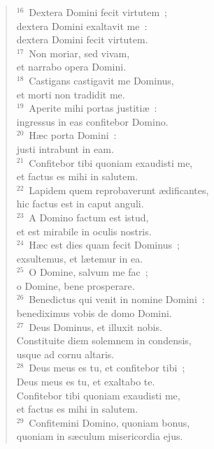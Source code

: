 \begin{flushleft}
\begin{verse}
${}^{16}$~Dextera Domini fecit virtutem~;\\ dextera Domini exaltavit me~:\\ dextera Domini fecit virtutem.\\
${}^{17}$~Non moriar, sed vivam,\\ et narrabo opera Domini.\\
${}^{18}$~Castigans castigavit me Dominus,\\ et morti non tradidit me.\\
${}^{19}$~Aperite mihi portas justiti\ae~:\\ ingressus in eas confitebor Domino.\\
${}^{20}$~H\ae c porta Domini~:\\ justi intrabunt in eam.\\
${}^{21}$~Confitebor tibi quoniam exaudisti me,\\ et factus es mihi in salutem.\\
${}^{22}$~Lapidem quem reprobaverunt \ae dificantes,\\ hic factus est in caput anguli.\\
${}^{23}$~A Domino factum est istud,\\ et est mirabile in oculis nostris.\\
${}^{24}$~H\ae c est dies quam fecit Dominus~;\\ exsultemus, et l\ae temur in ea.\\
${}^{25}$~O Domine, salvum me fac~;\\ o Domine, bene prosperare.\\
${}^{26}$~Benedictus qui venit in nomine Domini~:\\ benediximus vobis de domo Domini.\\
${}^{27}$~Deus Dominus, et illuxit nobis.\\ Constituite diem solemnem in condensis,\\ usque ad cornu altaris.\\
${}^{28}$~Deus meus es tu, et confitebor tibi~;\\ Deus meus es tu, et exaltabo te.\\ Confitebor tibi quoniam exaudisti me,\\ et factus es mihi in salutem.\\
${}^{29}$~Confitemini Domino, quoniam bonus,\\ quoniam in s\ae culum misericordia ejus.\end{verse}\end{flushleft}



